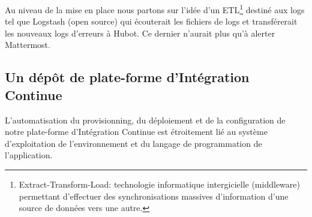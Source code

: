       Au niveau de la mise en place nous partons sur l'idée d'un ETL\footnote{Extract-Transform-Load: technologie informatique intergicielle (middleware) permettant d'effectuer des synchronisations massives d'information d'une source de données vers une autre.} destiné aux logs tel que Logstash (open source) qui écouterait les fichiers de logs et transférerait les nouveaux logs d'erreurs à Hubot. Ce dernier n'aurait plus qu'à alerter Mattermost.

      \subsection{Un dépôt de plate-forme d'Intégration Continue}
      L'automatisation du provisionning, du déploiement et de la configuration de notre plate-forme d'Intégration Continue est étroitement lié au système d'exploitation de l'environnement et du langage de programmation de l'application.
